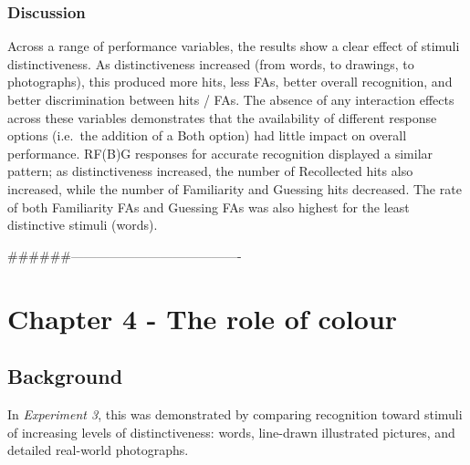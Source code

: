 \documentclass[
  11pt,
]{article}
\begin{document}
\hypertarget{discussion-2}{%
\subsubsection{Discussion}\label{discussion-2}}

Across a range of performance variables, the results show a clear effect
of stimuli distinctiveness. As distinctiveness increased (from words, to
drawings, to photographs), this produced more hits, less FAs, better
overall recognition, and better discrimination between hits / FAs. The
absence of any interaction effects across these variables demonstrates
that the availability of different response options (i.e.~the addition
of a Both option) had little impact on overall performance. RF(B)G
responses for accurate recognition displayed a similar pattern; as
distinctiveness increased, the number of Recollected hits also
increased, while the number of Familiarity and Guessing hits decreased.
The rate of both Familiarity FAs and Guessing FAs was also highest for
the least distinctive stimuli (words).

\#\#\#\#\#\#----------------------------------------

\newpage

\hypertarget{chapter-4---the-role-of-colour}{%
\section{Chapter 4 - The role of
colour}\label{chapter-4---the-role-of-colour}}

\hypertarget{background}{%
\subsection{Background}\label{background}}

In \emph{Experiment 3}, this was demonstrated by comparing recognition
toward stimuli of increasing levels of distinctiveness: words,
line-drawn illustrated pictures, and detailed real-world photographs.

~
\end{document}
